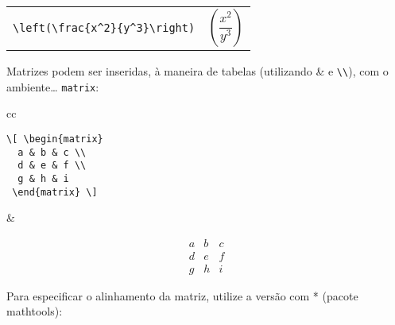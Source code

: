 \documentclass{scrartcl}
\begin{document}
\begin{center}
\begin{tabular}{cc}
\begin{minipage}{0.3\textwidth}
\begin{verbatim}
\left(\frac{x^2}{y^3}\right)
\end{verbatim}
\end{minipage}
&
\begin{minipage}{0.3\textwidth}
\begin{displaymath}
\left(\frac{x^2}{y^3}\right)
\end{displaymath}
\end{minipage}
\end{tabular}
\end{center}

\medskip

Matrizes podem ser inseridas, à maneira de tabelas (utilizando \& e \verb+\\+), com o ambiente\ldots{} \texttt{matrix}:

\medskip

\begin{center}
\begin{tabular}{cc}
\begin{minipage}{0.2\textwidth}
\begin{verbatim}
\[ \begin{matrix}
  a & b & c \\
  d & e & f \\
  g & h & i
 \end{matrix} \]
\end{verbatim}
\end{minipage} &%
 \begin{minipage}{0.2\textwidth}
\[  \begin{matrix}
   a & b & c \\
   d & e & f \\
   g & h & i
  \end{matrix} \]
  \end{minipage}
\end{tabular}
\end{center}

\medskip

\begin{center}
\end{center}

\bigskip

Para especificar o alinhamento da matriz, utilize a versão com * (pacote \textsf{mathtools}):
\end{document}
